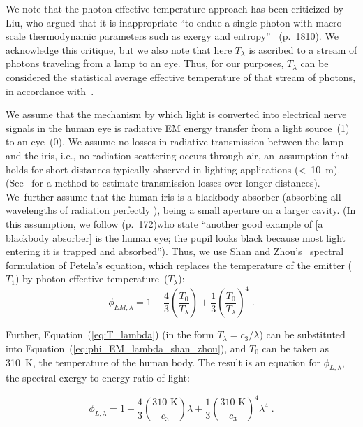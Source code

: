 \documentclass[energies,article,accept,moreauthors,pdftex]{Definitions/mdpi}\usepackage[]{graphicx}\usepackage[]{color}
\newcommand{\EM}{E \! M}
\begin{document}
We note that the photon effective temperature approach has been criticized by 
Liu,
who argued that it is inappropriate
``to endue a single photon with macro-scale thermodynamic parameters
such as exergy and entropy''~\citep{liu2009} (p.~1810).  We acknowledge this critique, 
but we also note that here $T_\lambda$ is ascribed to a stream of photons
traveling from a lamp to an eye.
Thus, for our purposes, $T_\lambda$ can be considered the statistical average effective temperature 
of that stream of photons,
in accordance with~\citet{Shan2019}.

We assume that the mechanism
by which light is converted into electrical nerve signals
in the human eye
is radiative EM energy transfer
from a light source~(1) to an eye~(0).
We assume no losses in radiative transmission
between the lamp and the iris,
i.e., no radiation scattering occurs through air, 
\mbox{an assumption} that holds for short distances typically 
observed in lighting applications (<~10~m).
(\mbox{See \citet{Shan2019}} for a method to estimate transmission losses
over longer distances).
\mbox{We further} assume that the human iris is a blackbody absorber 
(absorbing all wavelengths of radiation perfectly \cite{benenson2006handbook}), 
being a small aperture on a larger cavity.
(In this assumption, we follow  \citet{Rossing2020}  (p.~172)who state
``another good example of [a blackbody absorber] is the human eye;
the pupil looks black because most light entering it is trapped and absorbed'').
Thus, we use Shan and Zhou's~\cite{Shan2019} spectral formulation of Petela's equation,
which replaces the temperature of the emitter ($T_1$) by photon effective temperature~($T_\lambda$):
\begin{equation} \label{eq:phi_EM_lambda_shan_zhou}
 \phi_{\EM,\lambda} = 1 - \frac{4}{3} \left( \frac{T_{0}}{T_{\lambda}} \right)
                        + \frac{1}{3} \left(\frac{T_{0}}{T_{\lambda}}\right)^4 \; .
\end{equation}

Further, Equation~(\ref{eq:T_lambda}) (in the form $T_\lambda = c_3 / \lambda$)
can be substituted into Equation~(\ref{eq:phi_EM_lambda_shan_zhou}),
and $T_0$ can be taken as 310~K, the temperature of the human body.
The result is an equation for $\phi_{L,\lambda}$, the spectral exergy-to-energy ratio of light:

\begin{equation} \label{eq:phi_L_lambda_shan_zhou}
 \phi_{L,\lambda} = 1 
                    - \frac{4}{3} \left( \frac{310 \text{ K}}{c_3} \right) \lambda 
                    + \frac{1}{3} \left( \frac{310 \text{ K}}{c_3} \right)^4 \lambda^4 \; .
\end{equation}
\end{document}
